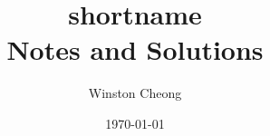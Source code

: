 \documentclass[11pt]{scrbook}
\title{shortname \\ Notes and Solutions}
\author{Winston Cheong}
\date{\today}
\begin{document}
\maketitle
\tableofcontents

\chapter{}
\section{}
\end{document}
